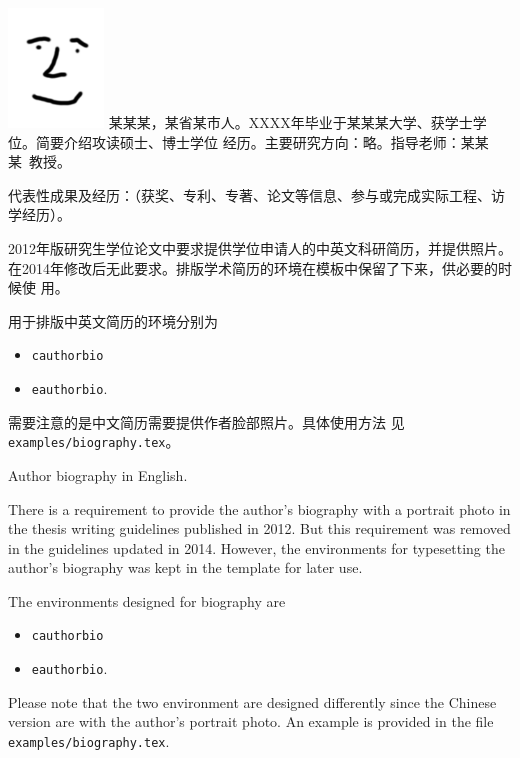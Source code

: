 
\begin{cauthorbio}{\includegraphics[height=1.25in]{photo}}
  某某某，某省某市人。XXXX年毕业于某某某大学、获学士学位。简要介绍攻读硕士、博士学位
  经历。主要研究方向：略。指导老师：某某某~教授。

  代表性成果及经历：（获奖、专利、专著、论文等信息、参与或完成实际工程、访学经历）。

  2012年版研究生学位论文中要求提供学位申请人的中英文科研简历，并提供照片。
  在2014年修改后无此要求。排版学术简历的环境在模板中保留了下来，供必要的时候使
  用。

  用于排版中英文简历的环境分别为
  \begin{itemize}
  \item \texttt{cauthorbio}
  \item \texttt{eauthorbio}.
  \end{itemize}
  需要注意的是中文简历需要提供作者脸部照片。具体使用方法
  见\texttt{examples/biography.tex}。
\end{cauthorbio}

\begin{eauthorbio}  
  \hspace{0.6cm} Author biography in English.

  There is a requirement to provide the author's biography with a portrait photo
  in the thesis writing guidelines published in 2012. But this requirement was
  removed in the guidelines updated in 2014. However, the environments for
  typesetting the author's biography was kept in the template for later use.

  The environments designed for biography are
  \begin{itemize}
  \item \texttt{cauthorbio}
  \item \texttt{eauthorbio}.
  \end{itemize}
  Please note that the two environment are designed differently since the
  Chinese version are with the author's portrait photo. An example is provided
  in the file \texttt{examples/biography.tex}.
\end{eauthorbio}

